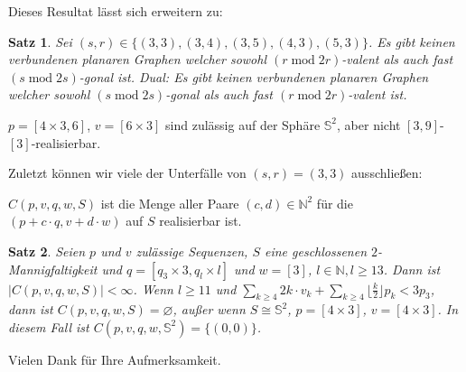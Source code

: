 \documentclass[10pt, notheorems]{beamer}
\newtheorem{theorem}{Satz}[section]
\let\emptyset\varnothing
\newcommand{\set}[1]{\{ #1 \}}
\newcommand{\nats}{\mathbb{N}}
\newcommand{\sphere}{\mathbb{S}}
\renewcommand{\mod}{\operatorname{mod}}
\newcommand{\hdef}[1]{\textcolor{darkred2}{#1}}
\begin{document}
\begin{frame}
  Dieses Resultat lässt sich erweitern zu:
  \begin{theorem}
    Sei $(s, r) \in \set{(3, 3), (3, 4), (3, 5), (4, 3), (5, 3)}$. Es gibt keinen verbundenen planaren Graphen welcher sowohl $(r \mod 2r)$-valent als auch fast $(s \mod 2s)$-gonal ist. Dual: Es gibt keinen verbundenen planaren Graphen welcher sowohl $(s \mod 2s)$-gonal als auch fast $(r \mod 2r)$-valent ist. 
  \end{theorem}

  \begin{example}
    $p = [4 \times 3, 6]$, $v = [6 \times 3]$ sind zulässig auf der Sphäre $\sphere^2$, aber nicht $[3, 9]$-$[3]$-realisierbar.
  \end{example}
\end{frame}

\begin{frame}
  Zuletzt können wir viele der Unterfälle von $(s, r) = (3, 3)$ ausschließen:
  \begin{definition}
    \hdef{$C(p, v, q, w, S)$} ist die Menge aller Paare $(c, d) \in \nats^2$ für die $(p + c \cdot q, v + d \cdot w)$ auf $S$ realisierbar ist.
  \end{definition}

  \begin{theorem}\label{thm:triangle:nonrealizable}
    Seien  $p$ und $v$ zulässige Sequenzen, $S$ eine geschlossenen $2$-Mannigfaltigkeit und $q = [q_3 \times 3, q_l \times l]$ und $w = [3]$, $l \in \nats, l \geq 13$. Dann ist $|C(p, v, q, w, S)| < \infty$. Wenn $l \geq 11$ und $\sum_{k \geq 4} 2k \cdot v_k + \sum_{k \geq 4} \lfloor \tfrac{k}{2} \rfloor p_k < 3p_3$, dann ist $C(p, v, q, w, S) = \emptyset$, außer wenn $S \cong \sphere^2$, $p = [4 \times 3]$, $v = [4 \times 3]$. In diesem Fall ist $C(p, v, q, w, \sphere^2) = \set{(0, 0)}$.
  \end{theorem}
\end{frame}

\begin{frame}
  \centering
  Vielen Dank für Ihre Aufmerksamkeit.
\end{frame}
\begin{frame}
  \footnotesize{
    
    {}
  }
\end{frame}

\begin{frame}
\end{frame}

\end{document}
